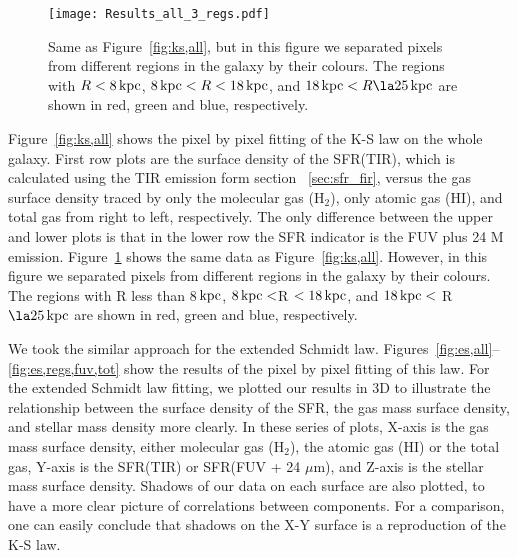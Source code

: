 \documentclass[useAMS,usenatbib]{mn2e}
\newcommand \kpc        {\,{\rm kpc}}
\begin{document}
\begin{figure*}
\texttt{[image: Results\_all\_3\_regs.pdf]}
\caption{Same as Figure~\ref{fig:ks,all}, but in this figure we separated pixels from different regions in the galaxy by their colours. The regions with $R< 8\kpc$, $8\kpc < R < 18\kpc$, and $18\kpc < R \la 25\kpc$ are shown in red, green and blue, respectively.}
\label{fig:ks,regs}
\end{figure*}

Figure~\ref{fig:ks,all} shows the pixel by pixel fitting of the K-S law on the whole galaxy. First row plots are the surface density of the SFR(TIR), which is calculated using  the TIR emission form section ~\ref{sec:sfr_fir}, versus the gas surface density traced by only the molecular gas (H$_2$),  only atomic gas (HI), and total gas from right to left, respectively. The only difference between the upper and lower plots is that in the lower row the SFR indicator is the FUV plus 24 M emission. Figure~\ref{fig:ks,regs} shows the same data as Figure~\ref{fig:ks,all}. However, in this figure we separated pixels from different regions in the galaxy by their colours. The regions with R less than 8$\kpc$, $8\kpc < $R $< 18\kpc$, and $18\kpc <$ R $\la 25\kpc$ are shown in red, green and blue, respectively. 

We took the similar approach for the extended Schmidt law. Figures~\ref{fig:es,all}--\ref{fig:es,regs,fuv,tot} show the results of the pixel by pixel fitting of this law. For the extended Schmidt law fitting, we plotted our results in 3D to illustrate the relationship between the surface density of the SFR, the gas mass surface density, and stellar mass density more clearly. In these series of plots, X-axis is the gas mass  surface density, either molecular gas (H$_2$), the atomic gas (HI) or the total gas, Y-axis is the SFR(TIR) or SFR(FUV + 24 $\mu$m), and Z-axis is the stellar mass surface density. Shadows of our data on each surface are also plotted, to have a more clear picture of correlations between components. For a comparison, one can easily conclude that shadows on the X-Y surface is a reproduction of the K-S law. 
\end{document}
